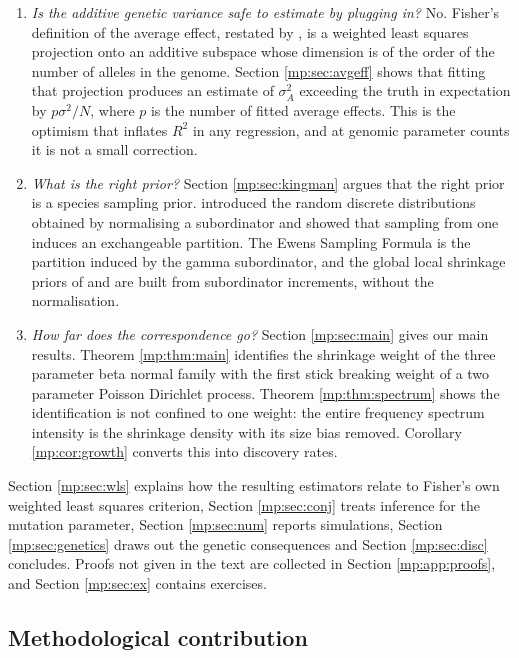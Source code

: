 \begin{enumerate}[leftmargin=1.6em]
\item \emph{Is the additive genetic variance safe to estimate by plugging in?} No.
Fisher's definition of the average effect, restated by \citet[Equation 10]{mp:ewens2024}, is a
weighted least squares projection onto an additive subspace whose dimension is of the order of the number of
alleles in the genome. Section \ref{mp:sec:avgeff} shows that fitting that projection produces
an estimate of $\sigma_A^2$ exceeding the truth in expectation by $p\sigma^2/N$, where $p$
is the number of fitted average effects. This is the optimism that inflates $R^2$ in any
regression, and at genomic parameter counts it is not a small correction.
\item \emph{What is the right prior?} Section \ref{mp:sec:kingman} argues that the right
prior is a species sampling prior. \citet{mp:kingman1975} introduced the random discrete
distributions obtained by normalising a subordinator and showed that sampling from one induces an
exchangeable partition. The Ewens Sampling Formula is the partition induced by the gamma
subordinator, and the global local shrinkage priors of \citet{mp:carvalho2010} and
\citet{mp:polson2012} are built from subordinator increments, without the normalisation.
\item \emph{How far does the correspondence go?} Section \ref{mp:sec:main} gives our main
results. Theorem \ref{mp:thm:main} identifies the shrinkage weight of the three parameter beta
normal family with the first stick breaking weight of a two parameter Poisson Dirichlet
process. Theorem \ref{mp:thm:spectrum} shows the identification is not confined to one weight:
the entire frequency spectrum intensity is the shrinkage density with its size bias removed. Corollary
\ref{mp:cor:growth} converts this into discovery rates.
\end{enumerate}

Section \ref{mp:sec:wls} explains how the resulting estimators relate to Fisher's own weighted
least squares criterion, Section \ref{mp:sec:conj} treats inference for the mutation parameter,
Section \ref{mp:sec:num} reports simulations, Section \ref{mp:sec:genetics} draws out the genetic
consequences and Section \ref{mp:sec:disc} concludes. Proofs not given in the text are
collected in Section \ref{mp:app:proofs}, and Section \ref{mp:sec:ex} contains exercises.

\subsection{Methodological contribution}
\label{mp:sec:contrib}

